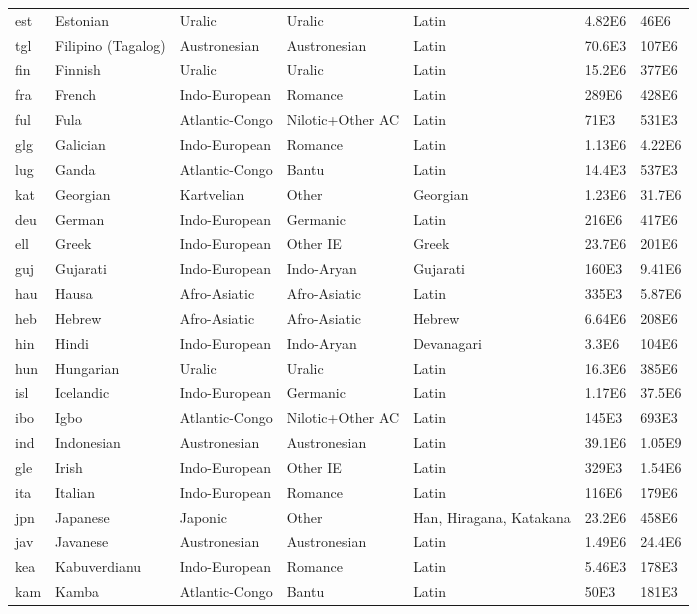 \begin{tabular}{l l l l lll}
est	& Estonian	&	Uralic	&	Uralic	&	Latin	&	4.82E6	&	46E6	\\
tgl	& Filipino  (Tagalog)	&	Austronesian	&	Austronesian	&	Latin	&	70.6E3	&	107E6	\\
fin	& Finnish	&	Uralic	&	Uralic	&	Latin	&	15.2E6	&	377E6	\\
fra	& French	&	Indo-European	&	Romance	&	Latin	&	289E6	&	428E6	\\
ful	& Fula	&	Atlantic-Congo& Nilotic+Other AC 	&	Latin	&	71E3	&	531E3	\\
glg	& Galician	&	Indo-European	&	Romance	&	Latin	&	1.13E6	&	4.22E6	\\
lug	& Ganda	&	Atlantic-Congo	&	Bantu	&	Latin	&	14.4E3	&	537E3	\\
kat	& Georgian	&	Kartvelian	&	Other	&	Georgian	&	1.23E6	&	31.7E6	\\
deu	& German	&	Indo-European	&	Germanic	&	Latin	&	216E6	&	417E6	\\
ell	& Greek	&	Indo-European	&	Other IE	&	Greek	&	23.7E6	&	201E6	\\
guj	& Gujarati	&	Indo-European	&	Indo-Aryan	&	Gujarati	&	160E3	&	9.41E6	\\
hau	& Hausa	&	Afro-Asiatic	&	Afro-Asiatic	&	Latin	&	335E3	&	5.87E6	\\
heb	& Hebrew	&	Afro-Asiatic	&	Afro-Asiatic	&	Hebrew	&	6.64E6	&	208E6	\\
hin	& Hindi	&	Indo-European	&	Indo-Aryan	&	Devanagari	&	3.3E6	&	104E6	\\
hun	& Hungarian	&	Uralic	&	Uralic	&	Latin	&	16.3E6	&	385E6	\\
isl	& Icelandic	&	Indo-European	&	Germanic	&	Latin	&	1.17E6	&	37.5E6	\\
ibo	& Igbo	&	Atlantic-Congo & Nilotic+Other AC 	&	Latin	&	145E3	&	693E3\\
ind	& Indonesian	&	Austronesian	&	Austronesian	&	Latin	&	39.1E6	&	1.05E9	\\
gle	& Irish	&	Indo-European	&	Other IE	&	Latin	&	329E3	&	1.54E6	\\
ita	& Italian	&	Indo-European	&	Romance	&	Latin	&	116E6	&	179E6	\\
jpn	& Japanese	&	Japonic	&	Other	& Han, Hiragana, Katakana	&	23.2E6	&	458E6	\\
jav	& Javanese	&	Austronesian	&	Austronesian	&	Latin	&	1.49E6	&	24.4E6	\\
kea	& Kabuverdianu	&	Indo-European	&	Romance	&	Latin	&	5.46E3	&	178E3	\\
kam	& Kamba	&	Atlantic-Congo	&	Bantu	&	Latin	&	50E3	&	181E3	\\

\end{tabular}
